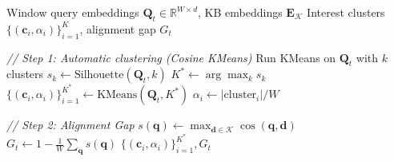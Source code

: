 \begin{algorithm}[t]
\caption{Interest Modeling: Auto-KMeans + Alignment Gap}
\label{alg:interest}
\begin{algorithmic}[1]
\REQUIRE Window query embeddings $\mathbf{Q}_t \in \mathbb{R}^{W \times d}$, KB embeddings $\mathbf{E}_{\mathcal{K}}$
\ENSURE Interest clusters $\{(\mathbf{c}_i, \alpha_i)\}_{i=1}^{K}$, alignment gap $G_t$

\STATE \textit{// Step 1: Automatic clustering (Cosine KMeans)}
    \STATE Run KMeans on $\mathbf{Q}_t$ with $k$ clusters
    \STATE $s_k \leftarrow \text{Silhouette}(\mathbf{Q}_t, k)$
\ENDFOR
\STATE $K^* \leftarrow \arg\max_k s_k$
\STATE $\{(\mathbf{c}_i, \alpha_i)\}_{i=1}^{K^*} \leftarrow \text{KMeans}(\mathbf{Q}_t, K^*)$
\STATE $\alpha_i \leftarrow |\text{cluster}_i| / W$ 

\STATE \textit{// Step 2: Alignment Gap}
    \STATE $s(\mathbf{q}) \leftarrow \max_{\mathbf{d} \in \mathcal{K}} \cos(\mathbf{q}, \mathbf{d})$
\ENDFOR
\STATE $G_t \leftarrow 1 - \frac{1}{W} \sum_{\mathbf{q}} s(\mathbf{q})$ 
\RETURN $\{(\mathbf{c}_i, \alpha_i)\}_{i=1}^{K^*}, G_t$
\end{algorithmic}
\end{algorithm}


